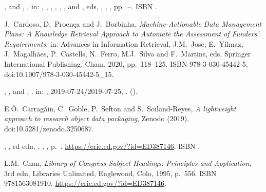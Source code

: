 \documentclass[ds,v1.1.2,openaccess]{iosart2x}%
\begin{document}
\begin{thebibliography}{}
%
\begin{bchapter}
,
 and
,
,
in: ,
,
,
,
,
,
 and
, eds,
,
,
,
pp.~--.
ISBN .
\end{bchapter}
%
\OrigBibText
J.~Cardoso,
D.~Proen{\c{c}}a and
J.~Borbinha,
\textit{Machine-Actionable Data Management Plans: A Knowledge Retrieval
Approach to Automate the Assessment of Funders' Requirements},
in: Advances in Information Retrieval,
J.M.~Jose,
E.~Yilmaz,
J.~Magalh{\~a}es,
P.~Castells,
N.~Ferro,
M.J.~Silva and
F.~Martins, eds,
Springer International Publishing,
Cham,
2020,
pp.~118--125.
ISBN 978-3-030-45442-5.
doi:10.1007/978-3-030-45442-5\_15.
\endOrigBibText
{}
\endbibitem

%
\begin{bchapter}
,
,
 and
,
.
in: , 
2019-07-24/2019-07-25, 
.
().
\end{bchapter}
%
\OrigBibText
E.{\'{O}}.~Carrag\'{a}in,
C.~Goble,
P.~Sefton and
S.~Soiland-Reyes,
\textit{A lightweight approach to research object data packaging},
Zenodo
(2019).
doi:10.5281/zenodo.3250687.
\endOrigBibText
{}
\endbibitem

%
\begin{bbook}
,
,
rd edn,
,
,
,
p.~.
\url{https://eric.ed.gov/?id=ED387146}.
ISBN .
\end{bbook}
%
\OrigBibText
L.M.~Chan,
\textit{Library of Congress Subject Headings: Principles and Application},
3rd edn,
Libraries Unlimited,
Englewood, Colo,
1995,
p.~556.
ISBN 9781563081910.
\url{https://eric.ed.gov/?id=ED387146}.
\endOrigBibText
{}
\endbibitem


\end{thebibliography}
\end{document}
